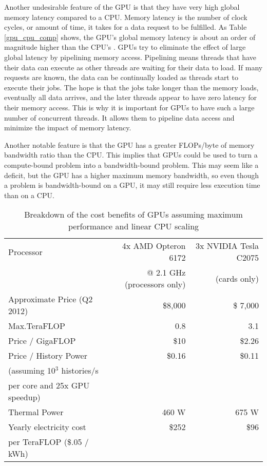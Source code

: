 Another undesirable feature of the GPU is that they have very high global memory latency compared to a CPU.  Memory latency is the number of clock cycles, or amount of time, it takes for a data request to be fulfilled.  As Table \ref{gpu_cpu_comp} shows, the GPU's global memory latency is about an order of magnitude higher than the CPU's \cite{cpu_latency,cuda}.  
GPUs try to eliminate the effect of large global latency by pipelining memory access.  Pipelining means threads that have their data can execute as other threads are waiting for their data to load.  If many requests are known, the data can be continually loaded as threads start to execute their jobs.  The hope is that the jobs take longer than the memory loads, eventually all data arrives, and the later threads appear to have zero latency for their memory access.  This is why it is important for GPUs to have such a large number of concurrent threads.  It allows them to pipeline data access and minimize the impact of memory latency.

Another notable feature is that the GPU has a greater FLOPs/byte of memory bandwidth ratio than the CPU.  This implies that GPUs could be used to turn a compute-bound problem into a bandwidth-bound problem.  This may seem like a deficit, but the GPU has a higher maximum memory bandwidth, so even though a problem is bandwidth-bound on a GPU, it may still require less execution time than on a CPU.

\begin{table}[h]
\centering
\caption[Breakdown of the cost benefits of GPUs assuming maximum performance and linear CPU scaling]{Breakdown of the cost benefits of GPUs assuming maximum performance and linear CPU scaling \cite{cost_sheets1,cost_sheets2,c2075,opterondate,opteronperformance}}
\label{gpu_money}
\begin{tabular}{| l | r | r |}
\hline
Processor & 4x AMD Opteron 6172  & 3x NVIDIA Tesla C2075 \\
  & @ 2.1 GHz (processors only) &  (cards only)  \\
\hline
\hline
Approximate Price (Q2 2012)& \$8,000 & \$ 7,000 \\
\hline
Max.TeraFLOP & 0.8 & 3.1 \\
\hline
Price / GigaFLOP & \$10 & \$2.26 \\
\hline
Price / History Power & \$0.16 & \$0.11 \\
(assuming 10$^3$ histories/s & & \\
per core and 25x GPU speedup) & & \\
\hline
Thermal Power & 460 W & 675 W \\
\hline
Yearly electricity cost & \$252  & \$96  \\
per TeraFLOP (\$.05 / kWh)   & & \\
\hline
\end{tabular}
\end{table}


